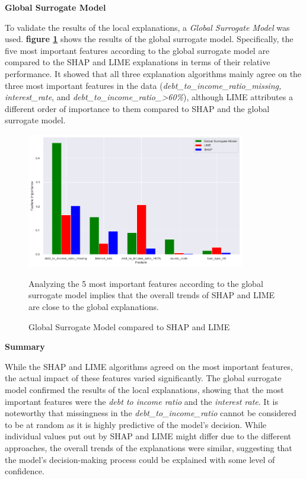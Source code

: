 \textbf{Global Surrogate Model}

To validate the results of the local explanations, a \textit{Global Surrogate Model} was used. \textbf{figure \ref{fig:Global_Surrogate}} shows the results of the global surrogate model. Specifically, the five most important features according to the global surrogate model are compared to the SHAP and LIME explanations in terms of their relative performance.
It showed that all three explanation algorithms mainly agree on the three most important features in the data (\textit{debt\_to\_income\_ratio\_missing, interest\_rate}, and \textit{debt\_to\_income\_ratio\_>60\%}), although LIME attributes a different order of importance to them compared to SHAP and the global surrogate model.

\begin{figure}[!htbp]
    \centering
    \includegraphics[width=0.85\textwidth]{images/CHXX_UPDATE_Surrogate_SHAP_LIME_combined.png}
    \caption{Global Surrogate Model compared to SHAP and LIME}
    \medskip
    \small
    Analyzing the 5 most important features according to the global surrogate model implies that the overall trends of SHAP and LIME are close to the global explanations.
    \label{fig:Global_Surrogate}
\end{figure}

\textbf{Summary}

While the SHAP and LIME algorithms agreed on the most important features, the actual impact of these features varied significantly. The global surrogate model confirmed the results of the local explanations, showing that the most important features were the \textit{debt to income ratio} and the \textit{interest rate}. 
It is noteworthy that missingness in the \textit{debt\_to\_income\_ratio} cannot be considered to be at random as it is highly predictive of the model's decision. 
While individual values put out by SHAP and LIME might differ due to the different approaches, the overall trends of the explanations were similar, suggesting that the model's decision-making process could be explained with some level of confidence.

